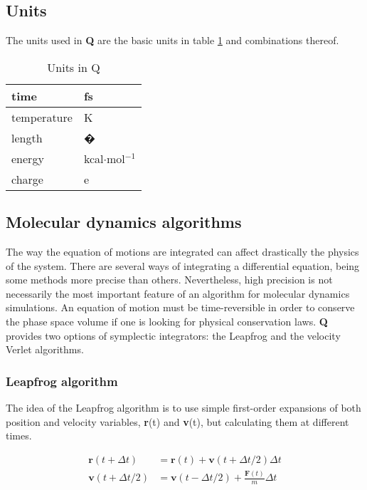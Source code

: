 \documentclass[a4paper,10pt]{article}
\begin{document}
\subsection{Units}
\label{subsec:units}

The units used in \textbf{Q} are the basic units in table \ref{tab:units}
and combinations thereof. \small
\begin{table}[h]
\begin{center}
\caption{Units in Q} \label{tab:units}
\begin{tabular}{|l|l|}
\hline time & fs \\
\hline temperature & K \\
\hline length & � \\
\hline energy & kcal$\cdot$mol$^{-1}$ \\
\hline charge & e \\
\hline
\end{tabular}
\end{center}
\end{table} \normalsize

\subsection{Molecular dynamics algorithms}
The way the equation of motions are integrated can affect drastically the 
physics of the system. There are several ways of integrating a differential 
equation, being some methods more precise than others. Nevertheless, 
high precision is not necessarily the most important feature of an algorithm 
for molecular dynamics simulations. An equation of motion must be 
time-reversible in order to conserve the phase space volume if one is looking 
for physical conservation laws. \textbf{Q} provides two options of symplectic 
integrators: the Leapfrog and the velocity Verlet algorithms.

\subsubsection{Leapfrog algorithm}
The idea of the Leapfrog algorithm is to use simple first-order expansions of 
both position and velocity variables, \textbf{r}(t) and \textbf{v}(t), but 
calculating them at different times.

\begin{align}
 \textbf{r}(t+\Delta t) &= \textbf{r}(t) + \textbf{v}(t+\Delta t/2) \Delta t \\
 \textbf{v}(t+\Delta t/2) &= \textbf{v}(t-\Delta t/2) + \frac{\textbf{F}(t)}{m}\Delta t
\end{align}
\end{document}
